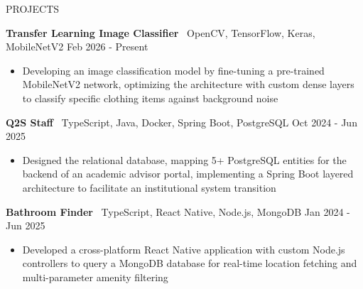 \documentclass{resume} %
\begin{document}
\begin{rSection}{PROJECTS}

\textbf{Transfer Learning Image Classifier} \textbar\ OpenCV, TensorFlow, Keras, MobileNetV2 \hfill Feb 2026 - Present
 \vspace{-.8em}
 \begin{itemize}
   \itemsep  -8pt {}
   \item Developing an image classification model by fine-tuning a pre-trained MobileNetV2 network,
 optimizing the architecture with custom dense layers to classify specific clothing items against background noise
\end{itemize}

\textbf{Q2S Staff} \textbar\  TypeScript, Java, Docker, Spring Boot, PostgreSQL \hfill Oct 2024 - Jun 2025
 \vspace{-.8em} 
 \begin{itemize}
   \itemsep  -8pt {}
   \item Designed the relational database, mapping 5+ PostgreSQL entities for the backend of an academic advisor portal,
   implementing a Spring Boot layered architecture to facilitate an institutional system transition 
 \end{itemize}

\textbf{Bathroom Finder} \textbar\ TypeScript, React Native, Node.js, MongoDB \hfill Jan 2024 - Jun 2025
 \vspace{-.8em}
 \begin{itemize}
   \itemsep  -8pt {}
   \item Developed a cross-platform React Native application with custom Node.js controllers to query a
    MongoDB database for real-time location fetching and multi-parameter amenity filtering  

 \end{itemize}

\end{rSection} 
\end{document}
